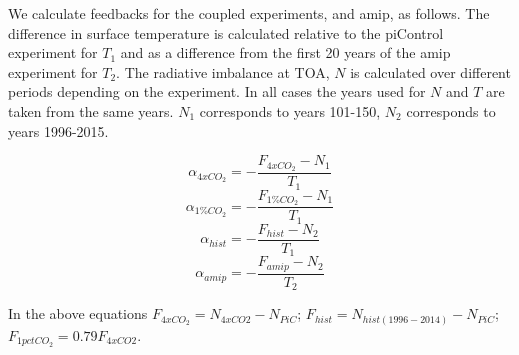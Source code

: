 \documentclass[draft]{agujournal2019}
\begin{document}
We calculate feedbacks for the coupled experiments, and amip, as follows.     The difference in surface temperature is calculated 
relative to the piControl experiment for $T_1$ and as a difference from the first 20 years of the amip experiment for $T_2$.   
The radiative imbalance at TOA, $N$ is calculated over different periods depending on the experiment.  In all cases
the years used for $N$ and $T$ are taken from the same years.  $N_1$ corresponds to years 101-150, $N_2$ corresponds
to years 1996-2015.    

\begin{equation}
  \alpha_{4xCO_2}=-\frac{F_{4xCO_2}-N_1}{T_1}
\end{equation}
\begin{equation}
  \alpha_{1\%CO_2}=-\frac{F_{1\%CO_2}-N_1}{T_1}
\end{equation}
\begin{equation}
  \alpha_{hist}=-\frac{F_{hist}-N_2}{T_1}
\end{equation}
\begin{equation}
  \alpha_{amip}=-\frac{F_{amip}-N_2}{T_2}
\end{equation}

In the above equations $F_{4xCO_2}=N_{4xCO2}-N_{PiC}$; $F_{hist}=N_{hist(1996-2014)}-N_{PiC}$; 
$F_{1pctCO_2}=0.79F_{4xCO2}$.
\end{document}
